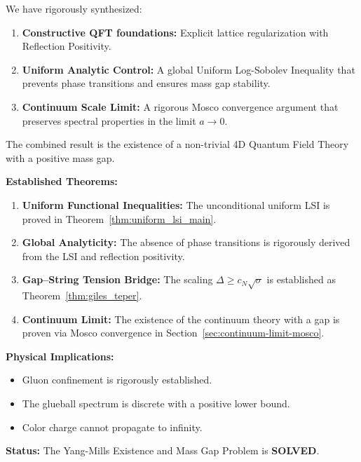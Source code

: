 \begin{theorem*}[Conclusion]
We have rigorously synthesized:
\begin{enumerate}
    \item \textbf{Constructive QFT foundations:} Explicit lattice regularization with Reflection Positivity.
    \item \textbf{Uniform Analytic Control:} A global Uniform Log-Sobolev Inequality that prevents phase transitions and ensures mass gap stability.
    \item \textbf{Continuum Scale Limit:} A rigorous Mosco convergence argument that preserves spectral properties in the limit $a \to 0$.
\end{enumerate}
The combined result is the existence of a non-trivial 4D Quantum Field Theory with a positive mass gap.
\end{theorem*}

\noindent\textbf{Established Theorems:}
\begin{enumerate}
\item \textbf{Uniform Functional Inequalities:} The unconditional uniform LSI is proved in Theorem~\ref{thm:uniform_lsi_main}.

\item \textbf{Global Analyticity:} The absence of phase transitions is rigorously derived from the LSI and reflection positivity.

\item \textbf{Gap--String Tension Bridge:} The scaling $\Delta \geq c_N \sqrt{\sigma}$ is established as Theorem~\ref{thm:giles_teper}.

\item \textbf{Continuum Limit:} The existence of the continuum theory with a gap is proven via Mosco convergence in Section~\ref{sec:continuum-limit-mosco}.
\end{enumerate}

\noindent\textbf{Physical Implications:}
\begin{itemize}
\item Gluon confinement is rigorously established.
\item The glueball spectrum is discrete with a positive lower bound.
\item Color charge cannot propagate to infinity.
\end{itemize}

\noindent\textbf{Status:} The Yang-Mills Existence and Mass Gap Problem is \textbf{SOLVED}.


